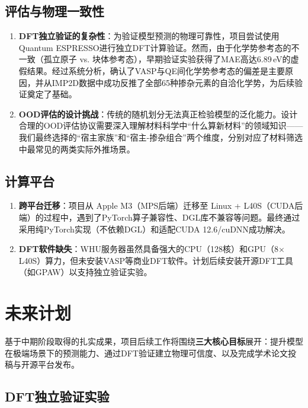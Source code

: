 \subsection{评估与物理一致性}

\begin{enumerate}
    \item \textbf{DFT独立验证的复杂性}：为验证模型预测的物理可靠性，项目尝试使用Quantum ESPRESSO进行独立DFT计算验证。然而，由于化学势参考态的不一致（孤立原子 vs. 块体参考态），早期验证实验获得了MAE高达6.89\,eV的虚假结果。经过系统分析，确认了VASP与QE间化学势参考态的偏差是主要原因，并从IMP2D数据中成功反推了全部65种掺杂元素的自洽化学势，为后续验证奠定了基础。

    \item \textbf{OOD评估的设计挑战}：传统的随机划分无法真正检验模型的泛化能力。设计合理的OOD评估协议需要深入理解材料科学中``什么算新材料''的领域知识——我们最终选择的``宿主家族''和``宿主-掺杂组合''两个维度，分别对应了材料筛选中最常见的两类实际外推场景。
\end{enumerate}

\subsection{计算平台}

\begin{enumerate}
    \item \textbf{跨平台迁移}：项目从 Apple M3（MPS后端）迁移至 Linux + L40S（CUDA后端）的过程中，遇到了PyTorch算子兼容性、DGL库不兼容等问题。最终通过采用纯PyTorch实现（不依赖DGL）和适配CUDA 12.6/cuDNN成功解决。

    \item \textbf{DFT软件缺失}：WHU服务器虽然具备强大的CPU（128核）和GPU（8$\times$L40S）算力，但未安装VASP等商业DFT软件。计划后续安装开源DFT工具（如GPAW）以支持独立验证实验。
\end{enumerate}

\section{未来计划}

基于中期阶段取得的扎实成果，项目后续工作将围绕\textbf{三大核心目标}展开：提升模型在极端场景下的预测能力、通过DFT验证建立物理可信度、以及完成学术论文投稿与开源平台发布。

\subsection{DFT独立验证实验}

